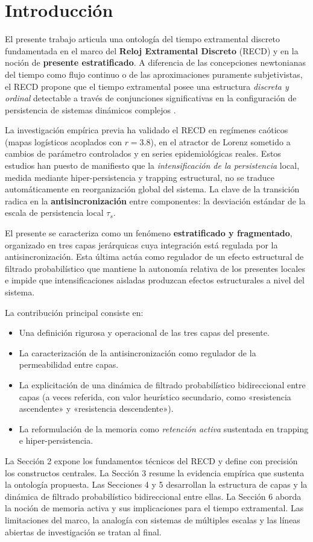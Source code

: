 \section{Introducción}

El presente trabajo articula una ontología del tiempo extramental discreto fundamentada en el marco del \textbf{Reloj Extramental Discreto} (RECD) y en la noción de \textbf{presente estratificado}. A diferencia de las concepciones newtonianas del tiempo como flujo continuo o de las aproximaciones puramente subjetivistas, el RECD propone que el tiempo extramental posee una estructura \textit{discreta y ordinal} detectable a través de conjunciones significativas en la configuración de persistencia de sistemas dinámicos complejos \citep{padilla_bayesian_accumulator_2026,padilla_sintesis_magna_2026}.

La investigación empírica previa ha validado el RECD en regímenes caóticos (mapas logísticos acoplados con $r=3.8$), en el atractor de Lorenz sometido a cambios de parámetro controlados y en series epidemiológicas reales. Estos estudios han puesto de manifiesto que la \textit{intensificación de la persistencia} local, medida mediante hiper-persistencia y trapping estructural, no se traduce automáticamente en reorganización global del sistema. La clave de la transición radica en la \textbf{antisincronización} entre componentes: la desviación estándar de la escala de persistencia local $\tau_s$.

El presente se caracteriza como un fenómeno \textbf{estratificado y fragmentado}, organizado en tres capas jerárquicas cuya integración está regulada por la antisincronización. Esta última actúa como regulador de un efecto estructural de filtrado probabilístico que mantiene la autonomía relativa de los presentes locales e impide que intensificaciones aisladas produzcan efectos estructurales a nivel del sistema.

La contribución principal consiste en:
\begin{itemize}
    \item Una definición rigurosa y operacional de las tres capas del presente.
    \item La caracterización de la antisincronización como regulador de la permeabilidad entre capas.
    \item La explicitación de una dinámica de filtrado probabilístico bidireccional entre capas (a veces referida, con valor heurístico secundario, como «resistencia ascendente» y «resistencia descendente»).
    \item La reformulación de la memoria como \textit{retención activa} sustentada en trapping e hiper-persistencia.
\end{itemize}

La Sección 2 expone los fundamentos técnicos del RECD y define con precisión los constructos centrales. La Sección 3 resume la evidencia empírica que sustenta la ontología propuesta. Las Secciones 4 y 5 desarrollan la estructura de capas y la dinámica de filtrado probabilístico bidireccional entre ellas. La Sección 6 aborda la noción de memoria activa y sus implicaciones para el tiempo extramental. Las limitaciones del marco, la analogía con sistemas de múltiples escalas y las líneas abiertas de investigación se tratan al final.